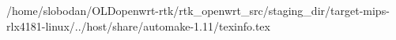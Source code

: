 /home/slobodan/OLDopenwrt-rtk/rtk_openwrt_src/staging_dir/target-mips-rlx4181-linux/../host/share/automake-1.11/texinfo.tex